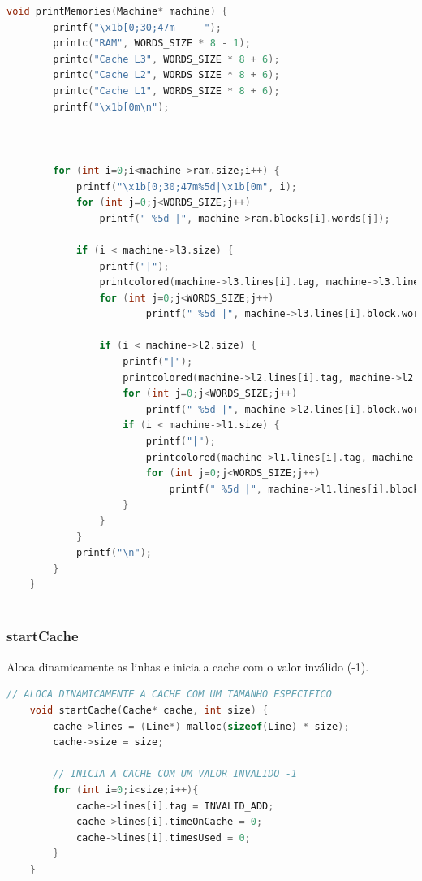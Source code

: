 \documentclass{article}
\begin{document}
\begin{lstlisting}[caption={Função printMemories},label={lst:cod4},language=C]
    void printMemories(Machine* machine) {
        printf("\x1b[0;30;47m     ");
        printc("RAM", WORDS_SIZE * 8 - 1);
        printc("Cache L3", WORDS_SIZE * 8 + 6);
        printc("Cache L2", WORDS_SIZE * 8 + 6);
        printc("Cache L1", WORDS_SIZE * 8 + 6);
        printf("\x1b[0m\n");
    
    
    
        for (int i=0;i<machine->ram.size;i++) {
            printf("\x1b[0;30;47m%5d|\x1b[0m", i);
            for (int j=0;j<WORDS_SIZE;j++)
                printf(" %5d |", machine->ram.blocks[i].words[j]);
    
            if (i < machine->l3.size) {
                printf("|");
                printcolored(machine->l3.lines[i].tag, machine->l3.lines[i].updated);
                for (int j=0;j<WORDS_SIZE;j++)
                        printf(" %5d |", machine->l3.lines[i].block.words[j]);
    
                if (i < machine->l2.size) {
                    printf("|");
                    printcolored(machine->l2.lines[i].tag, machine->l2.lines[i].updated);
                    for (int j=0;j<WORDS_SIZE;j++)
                        printf(" %5d |", machine->l2.lines[i].block.words[j]);
                    if (i < machine->l1.size) {
                        printf("|");
                        printcolored(machine->l1.lines[i].tag, machine->l1.lines[i].updated);
                        for (int j=0;j<WORDS_SIZE;j++)
                            printf(" %5d |", machine->l1.lines[i].block.words[j]);
                    }
                }
            }
            printf("\n");
        }
    }
    

\end{lstlisting}
\clearpage
\subsubsection{startCache}

Aloca dinamicamente as linhas e inicia a cache com o valor inválido (-1).

\begin{lstlisting}[caption={startCache},label={lst:cod6},language=C]
    // ALOCA DINAMICAMENTE A CACHE COM UM TAMANHO ESPECIFICO
    void startCache(Cache* cache, int size) {
        cache->lines = (Line*) malloc(sizeof(Line) * size);
        cache->size = size;
    
        // INICIA A CACHE COM UM VALOR INVALIDO -1
        for (int i=0;i<size;i++){
            cache->lines[i].tag = INVALID_ADD;
            cache->lines[i].timeOnCache = 0;
            cache->lines[i].timesUsed = 0;
        }
    }

\end{lstlisting}
\end{document}
